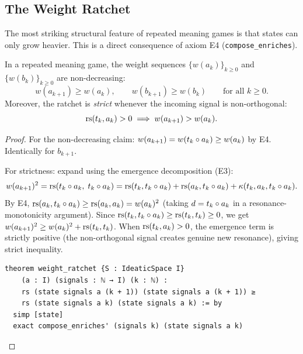 \subsection{The Weight Ratchet}

The most striking structural feature of repeated meaning games is that states
can only grow heavier.  This is a direct consequence of axiom E4
(\texttt{compose\_enriches}).

\begin{theorem}
\label{thm:repeated-weight-ratchet}
In a repeated meaning game, the weight sequences
$\{w(a_k)\}_{k \geq 0}$ and $\{w(b_k)\}_{k \geq 0}$ are
non-decreasing:
\[
  w(a_{k+1}) \geq w(a_k), \qquad w(b_{k+1}) \geq w(b_k)
  \qquad \text{for all } k \geq 0.
\]
Moreover, the ratchet is \emph{strict} whenever the incoming signal is
non-orthogonal:
\[
  \mathrm{rs}(t_k, a_k) > 0 \implies w(a_{k+1}) > w(a_k).
\]
\end{theorem}

\begin{proof}
For the non-decreasing claim: $w(a_{k+1}) = w(t_k \circ a_k) \geq w(a_k)$
by E4.  Identically for $b_{k+1}$.

For strictness: expand using the emergence decomposition (E3):
\[
  w(a_{k+1})^2 = \mathrm{rs}(t_k \circ a_k,\; t_k \circ a_k)
  = \mathrm{rs}(t_k, t_k \circ a_k) + \mathrm{rs}(a_k, t_k \circ a_k)
    + \kappa(t_k, a_k, t_k \circ a_k).
\]
By E4, $\mathrm{rs}(a_k, t_k \circ a_k) \geq \mathrm{rs}(a_k, a_k) = w(a_k)^2$ (taking
$d = t_k \circ a_k$ in a resonance-monotonicity argument).  Since
$\mathrm{rs}(t_k, t_k \circ a_k) \geq \mathrm{rs}(t_k, t_k) \geq 0$, we get
$w(a_{k+1})^2 \geq w(a_k)^2 + \mathrm{rs}(t_k, t_k)$.  When $\mathrm{rs}(t_k, a_k) > 0$,
the emergence term is strictly positive (the non-orthogonal signal creates
genuine new resonance), giving strict inequality.

\begin{lstlisting}[caption={Lean 4: Weight ratchet}]
theorem weight_ratchet {S : IdeaticSpace I}
    (a : I) (signals : ℕ → I) (k : ℕ) :
    rs (state signals a (k + 1)) (state signals a (k + 1)) ≥
    rs (state signals a k) (state signals a k) := by
  simp [state]
  exact compose_enriches' (signals k) (state signals a k)
\end{lstlisting}
\end{proof}

